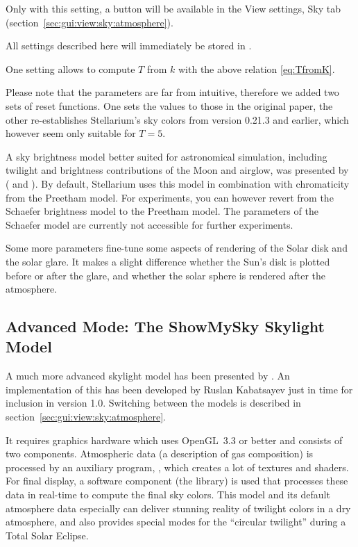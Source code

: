 Only with this setting, a button  will be
available in the View settings, Sky tab (section~\ref{sec:gui:view:sky:atmosphere}).

All settings described here will immediately be stored in . 

One setting allows to compute $T$ from $k$ with the above relation
\ref{eq:TfromK}.

Please note that the parameters are far from intuitive, therefore we
added two sets of reset functions. One sets the values to those in the
original paper, the other re-establishes Stellarium's sky colors from
version 0.21.3 and earlier, which however seem only suitable for
$T=5$.

A sky brightness model better suited for astronomical simulation,
including twilight and brightness contributions of the Moon and
airglow, was presented by \citeauthor{Schaefer:Limits-Archaeo}
(\citeyear{Schaefer:Limits-Archaeo} and
\citeyear{Schaefer:Limits}). By default, Stellarium uses this model in
combination with chromaticity from the Preetham model. For
experiments, you can however revert from the Schaefer brightness model
to the Preetham model. The parameters of the Schaefer model are
currently not accessible for further experiments.

Some more parameters fine-tune some aspects of rendering of the Solar
disk and the solar glare. It makes a slight difference whether the
Sun's disk is plotted before or after the glare, and whether the solar
sphere is rendered after the atmosphere. 

\subsection{Advanced Mode: The ShowMySky Skylight Model}
\label{sec:skylight:ShowMySky}

A much more advanced skylight model has been presented by
\citet{Bruneton:2008}. An implementation of this has been developed by
Ruslan Kabatsayev just in time for inclusion in version 1.0. Switching
between the models is described in
section~\ref{sec:gui:view:sky:atmosphere}.

It requires graphics hardware which uses OpenGL~3.3 or better and
consists of two components.  Atmospheric data (a description of gas
composition) is processed by an auxiliary program,
, which creates a lot of textures and shaders.
For final display, a software component (the
 library) is used that processes these data in
real-time to compute the final sky colors. This model and its default
atmosphere data especially can deliver stunning reality of twilight
colors in a dry atmosphere, and also provides special modes for the
``circular twilight'' during a Total Solar Eclipse.

